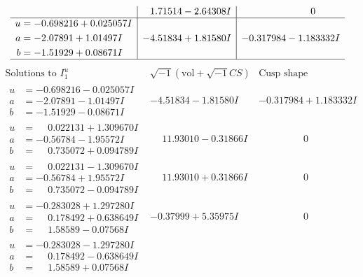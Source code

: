 \documentclass[1p]{elsarticle_modified}
\theoremstyle{definition}
\newcommand{\I}{\sqrt{-1}}
\begin{document}
$$\begin{array}{c|c|c}
 & \phantom{-}1.71514 - 2.64308 I & \phantom{-0.000000 } 0 \\ \hline\begin{aligned}
u &= -0.698216 + 0.025057 I \\
a &= -2.07891 + 1.01497 I \\
b &= -1.51929 + 0.08671 I\end{aligned}
 & -4.51834 + 1.81580 I & -0.317984 - 1.183332 I\\
 \hline 
 \end{array}$$\newpage$$\begin{array}{c|c|c}  
\text{Solutions to }I^u_{1}& \I (\text{vol} + \sqrt{-1}CS) & \text{Cusp shape}\\
 \hline 
\begin{aligned}
u &= -0.698216 - 0.025057 I \\
a &= -2.07891 - 1.01497 I \\
b &= -1.51929 - 0.08671 I\end{aligned}
 & -4.51834 - 1.81580 I & -0.317984 + 1.183332 I \\ \hline\begin{aligned}
u &= \phantom{-}0.022131 + 1.309670 I \\
a &= -0.56784 - 1.95572 I \\
b &= \phantom{-}0.735072 + 0.094789 I\end{aligned}
 & \phantom{-}11.93010 - 0.31866 I & \phantom{-0.000000 } 0 \\ \hline\begin{aligned}
u &= \phantom{-}0.022131 - 1.309670 I \\
a &= -0.56784 + 1.95572 I \\
b &= \phantom{-}0.735072 - 0.094789 I\end{aligned}
 & \phantom{-}11.93010 + 0.31866 I & \phantom{-0.000000 } 0 \\ \hline\begin{aligned}
u &= -0.283028 + 1.297280 I \\
a &= \phantom{-}0.178492 + 0.638649 I \\
b &= \phantom{-}1.58589 - 0.07568 I\end{aligned}
 & -0.37999 + 5.35975 I & \phantom{-0.000000 } 0 \\ \hline\begin{aligned}
u &= -0.283028 - 1.297280 I \\
a &= \phantom{-}0.178492 - 0.638649 I \\
b &= \phantom{-}1.58589 + 0.07568 I\end{aligned}

\end{array}$$
\end{document}
